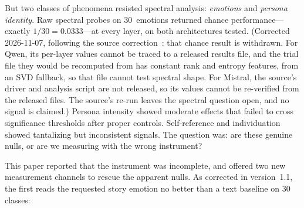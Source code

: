 \documentclass[11pt,a4paper]{article}
\begin{document}
But two classes of phenomena resisted spectral analysis: \emph{emotions} and
\emph{persona identity}. Raw spectral probes on 30~emotions returned chance
performance---exactly $1/30 = 0.0333$---at every layer, on both architectures
tested. (Corrected 2026-11-07, following the source
correction~\citep{lyra_p4}: that chance result is withdrawn. For Qwen, its
per-layer values cannot be traced to a released results file, and the trial
file they would be recomputed from has constant rank and entropy features,
from an SVD fallback, so that file cannot test spectral shape. For Mistral,
the source's driver and analysis script are not released, so its values
cannot be re-verified from the released files. The source's re-run leaves the
spectral question open, and no signal is claimed.) Persona intensity showed moderate effects that failed to cross
significance thresholds after proper controls. Self-reference and
individuation showed tantalizing but inconsistent signals. The question was:
are these genuine nulls, or are we measuring with the wrong instrument?

This paper reported that the instrument was incomplete, and offered two new
measurement channels to rescue the apparent nulls. As corrected in
version~1.1, the first reads the requested story emotion no better than a
text baseline on 30 classes:
\end{document}
